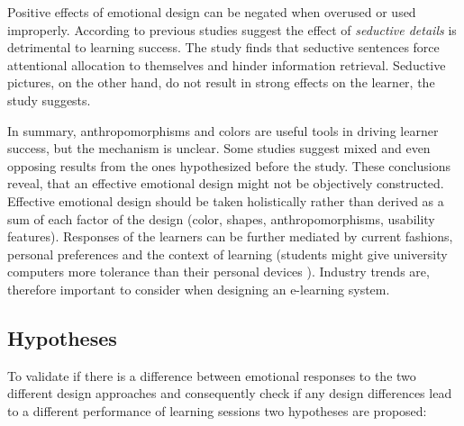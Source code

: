 		
		Positive effects of emotional design can be negated when overused or used improperly. According to \cite{Chang2014} previous studies suggest the effect of \textit{seductive details} is detrimental to learning success. The study finds that seductive sentences force attentional allocation to themselves and hinder information retrieval. Seductive pictures, on the other hand, do not result in strong effects on the learner, the study suggests.
		
		In summary, anthropomorphisms and colors are useful tools in driving learner success, but the mechanism is unclear. Some studies suggest mixed and even opposing results from the ones hypothesized before the study. These conclusions reveal, that an effective emotional design might not be objectively constructed. Effective emotional design should be taken holistically rather than derived as a sum of each factor of the design (color, shapes, anthropomorphisms, usability features). Responses of the learners can be further mediated by current fashions, personal preferences and the context of learning (students might give university computers more tolerance than their personal devices \cite{Heidig2015}). Industry trends are, therefore important to consider when designing an e-learning system.
		
		
	
	\subsection{Hypotheses} \label{sec:hypothesis}
	
		To validate if there is a difference between emotional responses to the two different design approaches and consequently check if any design differences lead to a different performance of learning sessions two hypotheses are proposed:
	

